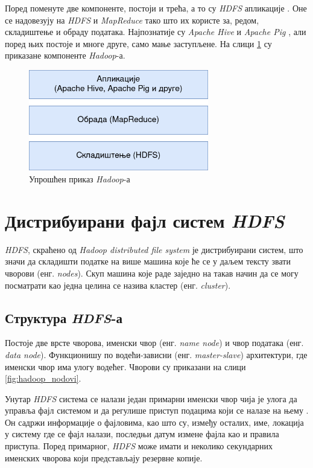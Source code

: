 \documentclass[12pt,oneside]{memoir}
\begin{document}
Поред поменуте две компоненте, постоји и трећа, а то су \textit{HDFS} апликације \cite{hadoop_learning}. Оне се надовезују на \textit{HDFS} и \textit{MapReduce} тако што их користе за, редом, складиштење и обраду података. Најпознатије су \textit{Apache Hive} \cite{apache_hive} и \textit{Apache Pig} \cite{apache_pig}, али поред њих постоје и многе друге, само мање заступљене. На слици \ref{fig:hadoop_aplikacije} су приказане компоненте \textit{Hadoop}-а.

\begin{figure}[!ht]
  \centering
  \includegraphics[width=0.7\textwidth]{pictures/hadoop_apps.png}
  \caption{Упрошћен приказ \textit{Hadoop}-а}
  \label{fig:hadoop_aplikacije}
\end{figure}

\section{Дистрибуирани фајл систем \textit{HDFS}}
\label{sec:hdfs}

\textit{HDFS}, скраћено од \textit{Hadoop distributed file system} је дистрибуирани систем, што значи да складишти податке на више машина које ће се у даљем тексту звати чворови (енг. \textit{nodes}). Скуп машина које раде заједно на такав начин да се могу посматрати као једна целина се назива кластер (енг. \textit{cluster}). 

\subsection{Структура \textit{HDFS}-а}
\label{subsec:hdfs_nodes}

Постоје две врсте чворова, именски чвор (енг. \textit{name node}) и чвор података (енг. \textit{data node}). Функционишу по водећи-зависни (енг. \textit{master-slave}) архитектури, где именски чвор има улогу водећег. Чворови су приказани на слици \ref{fig:hadoop_nodovi}.

Унутар \textit{HDFS} система се налази један примарни именски чвор чија је улога да управља фајл системом и да регулише приступ подацима који се налазе на њему \cite{hadoop_arch_guide}. Он садржи информације о фајловима, као што су, између осталих, име, локација у систему где се фајл налази, последњи датум измене фајла као и правила приступа. Поред примарног, \textit{HDFS} може имати и неколико секундарних именских чворова који представљају резервне копије.
\end{document}
